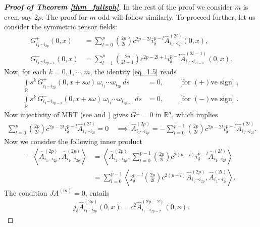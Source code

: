 \documentclass[11pt,a4paper,reqno]{amsart}
\begin{document}
\begin{proof}[\textbf{Proof of Theorem \ref{thm_fullsph}}]
In the rest of the proof we consider $m$ is even, say $2p$. The proof for $m$ odd will follow similarly. To proceed further, let us consider the symmetric tensor fields:
		\begin{align*}
			G_{i_1\cdots i_{2p}}^+(0,x)&= \sum\limits_{l=0}^{p} \binom{2p}{2l} c^{2p-2l} i^{p-l}_{\delta}\hat{A}_{i_1\cdots i_{2l}}^{(2l)}(0,x),\\
			G_{i_1\cdots i_{2p-1}}^-(0,x)&=  \sum\limits_{l=1}^{p}  \binom{2p}{2l-1} c^{2p-2l+1}i^{p-l}_{\delta}\hat{A}_{i_1\cdots i_{2l-1}}^{(2l-1)}(0,x).
		\end{align*}
		Now, for each $k=0,1,\cdots,m$, the identity \eqref{eq_1.5} reads
		\begin{align*}
			\int\limits_{\mathbb{R}} s^k\,  G_{i_1\cdots i_{2p}}^+(0,x+s\omega) \,\omega_{i_1}\cdots \omega_{i_{2p}} \, ds&=0, \qquad \text{ [for $(+)$ve sign] },\\
			\int\limits_{\mathbb{R}} s^k\,  G_{i_1\cdots i_{2p-1}}^-(0,x+s\omega) \,\omega_{i_1}\cdots \omega_{i_{2p-1}} \, ds&=0, \qquad \text{ [for $(-)$ve sign] }.
		\end{align*}
		Now injectivity of MRT (see \cite[Theorem 2.17.2]{Sharafutdinov_book} and \cite{krishnan2018momentum,BKS_MRT_polyharmonic}) gives $ G^{\pm}=0$ in $ \mathbb{R}^n$, which implies 
		\begin{align*}
			\sum\limits_{l=0}^{p} \binom{2p}{2l} c^{2p-2l}  i^{p-l}_{\delta}\hat{A}_{i_1\cdots i_{2l}}^{(2l)}=0 \quad \implies \,
			\hat{A}_{i_1\cdots i_{2p}}^{(2p)}=- \sum\limits_{l=0}^{p-1}  \binom{2p}{2l}  c^{2p-2l} i^{p-l}_{\delta}\hat{A}_{i_1\cdots i_{2l}}^{(2l)}.
		\end{align*}
		Now we consider the following inner product 
		\begin{equation}\label{eq_inner_prod}
			\begin{aligned}
				-\left\langle \hat{A}_{i_1\cdots i_{2p}}^{(2p)} , \hat{A}_{i_1\cdots i_{2p}}^{(2p)} \right\rangle
				&=\left\langle \hat{A}_{i_1\cdots i_{2p}}^{(2p)} ,  \sum\limits_{l=0}^{p-1} \binom{2p}{2l} c^{2(p-l)} i^{p-l}_{\delta}\hat{A}_{i_1\cdots i_{2l}}^{(2l)} \right\rangle
				\\&= \sum\limits_{l=0}^{p-1}\left\langle j^{p-l}_{\delta} \binom{2p}{2l} c^{2(p-l)} \hat{A}_{i_1\cdots i_{2p}}^{(2p)} ,   \hat{A}_{i_1\cdots i_{2l}}^{(2l)} \right\rangle.
			\end{aligned}
		\end{equation}
		The condition $JA^{(m)}=0$, entails 
		\begin{align*}
			j_{\delta} \hat{A}^{(2p)}_{i_1\cdots i_{2p}}(0,x)=  {c^2} \hat{A}^{(2p-2)}_{i_1\cdots i_{2p-2}}(0,x).

\end{align*}
\end{proof}
\end{document}

